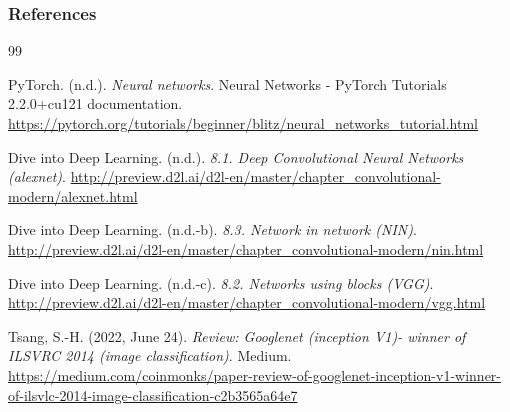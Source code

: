 \documentclass[11pt,compress,t,notes=noshow, xcolor=table]{beamer}
\begin{document}
\begin{vbframe}
\frametitle{References}
\footnotesize{
\begin{thebibliography}{99}

 PyTorch. (n.d.). \textit{Neural networks}. Neural Networks - PyTorch Tutorials 2.2.0+cu121 documentation. \url{https://pytorch.org/tutorials/beginner/blitz/neural_networks_tutorial.html}

 Dive into Deep Learning. (n.d.). \textit{8.1. Deep Convolutional Neural Networks (alexnet)}. \url{http://preview.d2l.ai/d2l-en/master/chapter_convolutional-modern/alexnet.html}

Dive into Deep Learning. (n.d.-b). \textit{8.3. Network in network (NIN)}. \url{http://preview.d2l.ai/d2l-en/master/chapter_convolutional-modern/nin.html}

 Dive into Deep Learning. (n.d.-c). \textit{8.2. Networks using blocks (VGG)}. \url{http://preview.d2l.ai/d2l-en/master/chapter_convolutional-modern/vgg.html}

 Tsang, S.-H. (2022, June 24). \textit{Review: Googlenet (inception V1)- winner of ILSVRC 2014 (image classification)}. Medium. \url{https://medium.com/coinmonks/paper-review-of-googlenet-inception-v1-winner-of-ilsvlc-2014-image-classification-c2b3565a64e7} 


\end{thebibliography}}
\end{vbframe}
\end{document}
